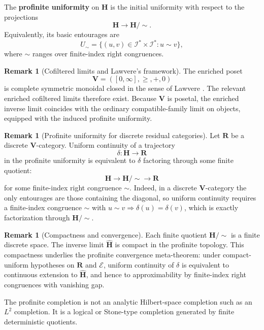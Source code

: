 \documentclass[12pt]{article}
\theoremstyle{definition}
\newtheorem{remark}[theorem]{Remark}
\begin{document}
The \textbf{profinite uniformity} on $\mathbf H$ is the initial uniformity
with respect to the projections
\[
\mathbf H\to\mathbf H/\!\sim.
\]
Equivalently, its basic entourages are
\[
U_\sim
=
\{(u,v)\in\mathcal I^*\times\mathcal I^*:u\sim v\},
\]
where $\sim$ ranges over finite-index right congruences.

\begin{remark}[Cofiltered limits and Lawvere's framework]
\label{rem:lawvere-limit}
The enriched poset
\[
\mathbf V=([0,\infty],\ge,+,0)
\]
is complete symmetric monoidal closed in the sense of Lawvere
\cite{lawvere1973}.  The relevant enriched cofiltered limits therefore exist.
Because $\mathbf V$ is posetal, the enriched inverse limit coincides with the
ordinary compatible-family limit on objects, equipped with the induced
profinite uniformity.
\end{remark}

\begin{remark}[Profinite uniformity for discrete residual categories]
\label{rem:profinite-discrete}
Let $\mathbf R$ be a discrete $\mathbf V$-category.  Uniform continuity of a
trajectory
\[
\delta:\mathbf H\to\mathbf R
\]
in the profinite uniformity is equivalent to $\delta$ factoring through some
finite quotient:
\[
\mathbf H
\longrightarrow
\mathbf H/\!\sim
\longrightarrow
\mathbf R
\]
for some finite-index right congruence $\sim$.  Indeed, in a discrete
$\mathbf V$-category the only entourages are those containing the diagonal, so
uniform continuity requires a finite-index congruence $\sim$ with
$u\sim v\Rightarrow\delta(u)=\delta(v)$, which is exactly factorization through
$\mathbf H/\!\sim$.
\end{remark}

\begin{remark}[Compactness and convergence]
\label{rem:profinite-compact}
Each finite quotient $\mathbf H/\!\sim$ is a finite discrete space.  The
inverse limit $\widehat{\mathbf H}$ is compact in the profinite topology.
This compactness underlies the profinite convergence meta-theorem: under
compact-uniform hypotheses on $\mathbf R$ and $\mathcal E$, uniform continuity
of $\delta$ is equivalent to continuous extension to $\widehat{\mathbf H}$,
and hence to approximability by finite-index right congruences with vanishing
gap.
\end{remark}

The profinite completion is not an analytic Hilbert-space completion such as
an $L^2$ completion.  It is a logical or Stone-type completion generated by
finite deterministic quotients.
\end{document}
